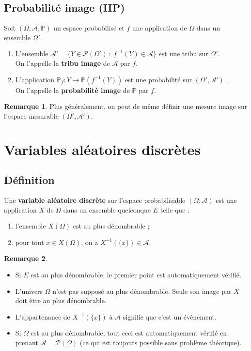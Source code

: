 \documentclass[french]{article}
\renewcommand{\P}{\mathbb{P}}
\newcommand{\inv}{^{-1}}
\theoremstyle{plain}
\theoremstyle{definition}
\newtheorem*{rmq}{Remarque}
\theoremstyle{remark}
\begin{document}
\subsection{Probabilité image (HP)}

\begin{thm}{}%
	Soit $(\Omega,\mathcal{A},\P)$ un espace probabilisé et $f$ une application de $\Omega$ dans un ensemble $\Omega'$.
	\begin{enumerate}
		\item L'ensemble $\mathcal{A}'=\{Y\in\mathcal{P}(\Omega')\ :\ f\inv(Y)\in\mathcal{A}\}$ est une tribu sur $\Omega'$.\\
		On l'appelle la \textbf{tribu image} de $\mathcal{A}$ par $f$.
		\item L'application $\P_f:Y\mapsto\P(f\inv(Y))$ est une probabilité sur $(\Omega',\mathcal{A}')$.\\
		On l'appelle la \textbf{probabilité image} de $\P$ par $f$.
	\end{enumerate}
\end{thm}

\begin{rmq}
	Plus généralement, on peut de même définir une mesure image sur l'espace mesurable $(\Omega',\mathcal{A}')$.
\end{rmq}

\section{Variables aléatoires discrètes}

\subsection{Définition}

\begin{dfn}
	Une \textbf{variable aléatoire discrète} sur l'espace probabilisable $(\Omega,\mathcal{A})$ est une application $X$ de $\Omega$ dans un ensemble quelconque $E$ telle que :
	\begin{enumerate}
		\item l'ensemble $X(\Omega)$ est au plus dénombrable ;
		\item pour tout $x\in X(\Omega)$, on a $X\inv(\{x\})\in\mathcal{A}$.
	\end{enumerate}
\end{dfn}

\begin{rmq}
	\begin{itemize}
		\item Si $E$ est au plus dénombrable, le premier point est automatiquement vérifié.
		\item L'univers $\Omega$ n'est pas supposé au plus dénombrable. Seule son image par $X$ doit être au plus dénombrable.
		\item L'appartenance de $X\inv(\{x\})$ à $\mathcal{A}$ signifie que c'est un événement.
		\item Si $\Omega$ est au plus dénombrable, tout ceci est automatiquement vérifié en prenant $\mathcal{A}=\mathcal{P}(\Omega)$ (ce qui est toujours possible sans problème théorique).
	\end{itemize}
\end{rmq}
\end{document}
